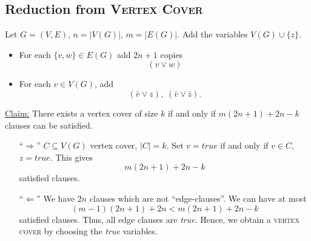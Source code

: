 \documentclass[oneside,a4paper]{amsart}
\begin{document}
\subsection*{Reduction from \textnormal{\textsc{Vertex Cover}}}
Let $G = (V, E)$, $n = |V(G)|$, $m = |E(G)|$.
Add the variables $V(G) \cup \{ z \}$.
\begin{itemize}
\item For each $\{ v, w \} \in E(G)$ add $2n + 1$ copies
\[
	(v \vee w)
\]
\item For each $v \in V(G)$, add
\[
	(\bar{v} \vee z), \; (\bar{v} \vee \bar{z}).
\]
\end{itemize}
\underline{Claim:} There exists a vertex cover of size $k$ if and only if $m (2n + 1) + 2n -k$ clauses can be satisfied.
\begin{itemize}
\item[``$\Rightarrow$''] $C \subseteq V(G)$ vertex cover, $|C| = k$. Set $v = \textit{true}$ if and only if $v \in C$, $z = \textit{true}$. This gives
\[
	m(2n + 1) + 2n -k
\]
satisfied clauses.
\item[``$\Leftarrow$''] We have $2n$ clauses which are not ``edge-clauses''. We can have at most
\[
	(m - 1)(2n + 1) + 2n < m (2n + 1) + 2n - k
\]
satisfied clauses. Thus, all edge clauses are \textit{true}. Hence, we obtain a \textsc{vertex cover} by choosing the \textit{true} variables.
\end{itemize}
\end{document}
